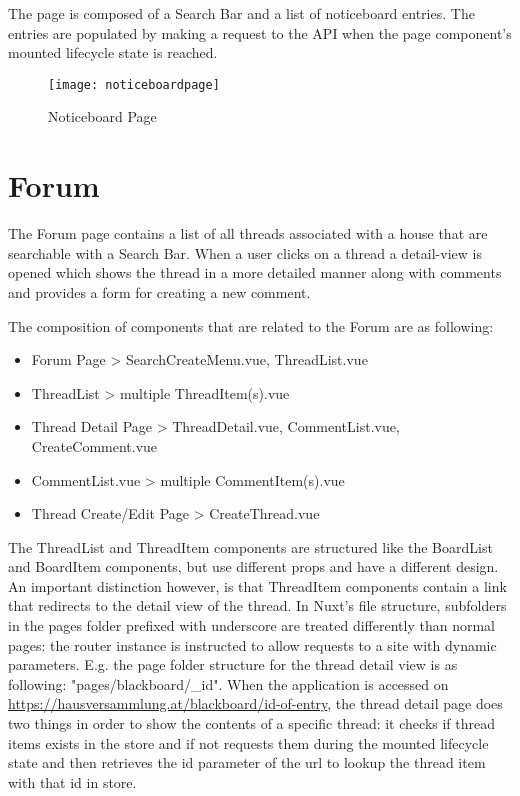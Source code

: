 The page is composed of a Search Bar and a list of noticeboard entries. The entries are populated by making a request to the API when the page component's mounted lifecycle state is reached.

\begin{figure}[H]
  \begin{center}
  \texttt{[image: noticeboardpage]}
  \end{center}
  \caption{Noticeboard Page}
  \label{fig:langswitcher}
\end{figure}

\section{Forum}
The Forum page contains a list of all threads associated with a house that are searchable with a Search Bar. When a user clicks on a thread a detail-view is opened which shows the thread in a more detailed manner along with comments and provides a form for creating a new comment.

The composition of components that are related to the Forum are as following:

\begin{itemize}
  \item Forum Page > SearchCreateMenu.vue, ThreadList.vue
  \item ThreadList > multiple ThreadItem(s).vue
  \item Thread Detail Page > ThreadDetail.vue, CommentList.vue, CreateComment.vue
  \item CommentList.vue > multiple CommentItem(s).vue
  \item Thread Create/Edit Page > CreateThread.vue
\end{itemize}

The ThreadList and ThreadItem components are structured like the BoardList and BoardItem components, but use different props and have a different design. An important distinction however, is that ThreadItem components contain a link that redirects to the detail view of the thread. In Nuxt's file structure, subfolders in the pages folder prefixed with underscore are treated differently than normal pages: the router instance is instructed to allow requests to a site with dynamic parameters. E.g. the page folder structure for the thread detail view is as following: "pages/blackboard/\_id". When the application is accessed on \url{https://hausversammlung.at/blackboard/id-of-entry}, the thread detail page does two things in order to show the contents of a specific thread: it checks if thread items exists in the store and if not requests them during the mounted lifecycle state and then retrieves the id parameter of the url to lookup the thread item with that id in store.

